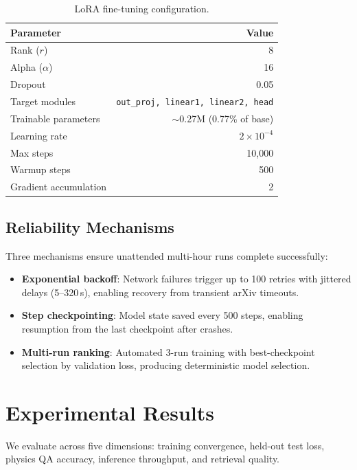 \documentclass[11pt]{article}
\begin{document}
\begin{table}[t]
\centering
\caption{LoRA fine-tuning configuration.}
\label{tab:lora_config}
\begin{tabular}{lr}
\toprule
\textbf{Parameter} & \textbf{Value} \\
\midrule
Rank ($r$) & 8 \\
Alpha ($\alpha$) & 16 \\
Dropout & 0.05 \\
Target modules & \texttt{out\_proj, linear1, linear2, head} \\
Trainable parameters & $\sim$0.27M (0.77\% of base) \\
Learning rate & $2 \times 10^{-4}$ \\
Max steps & 10,000 \\
Warmup steps & 500 \\
Gradient accumulation & 2 \\
\bottomrule
\end{tabular}
\end{table}

\subsection{Reliability Mechanisms}

Three mechanisms ensure unattended multi-hour runs complete successfully:

\begin{itemize}[leftmargin=*]
    \item \textbf{Exponential backoff}: Network failures trigger up to 100 retries with jittered delays (5--320\,s), enabling recovery from transient arXiv timeouts.
    \item \textbf{Step checkpointing}: Model state saved every 500 steps, enabling resumption from the last checkpoint after crashes.
    \item \textbf{Multi-run ranking}: Automated 3-run training with best-checkpoint selection by validation loss, producing deterministic model selection.
\end{itemize}

\section{Experimental Results}
\label{sec:results}

We evaluate across five dimensions: training convergence, held-out test loss, physics QA accuracy, inference throughput, and retrieval quality.
\end{document}

